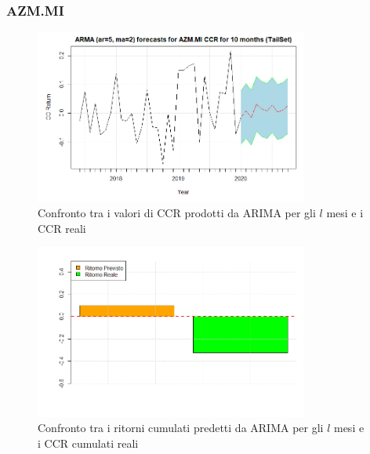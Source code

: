 \documentclass[12pt]{article}
\begin{document}
\subsubsection{AZM.MI}
\begin{figure}[!htb]
    \centering
    \includegraphics[width=0.8\textwidth]{immagini/foreAZM.png}
    \caption{Confronto tra i valori di CCR prodotti da ARIMA per gli $l$ mesi e i CCR reali}
\end{figure}
\FloatBarrier
\begin{figure}[!htb]
    \centering
    \includegraphics[width=0.8\textwidth]{immagini/foreAZMbar.png}
    \caption{Confronto tra i ritorni cumulati predetti da ARIMA per gli $l$ mesi e i CCR cumulati reali}
\end{figure}
\FloatBarrier
\end{document}
